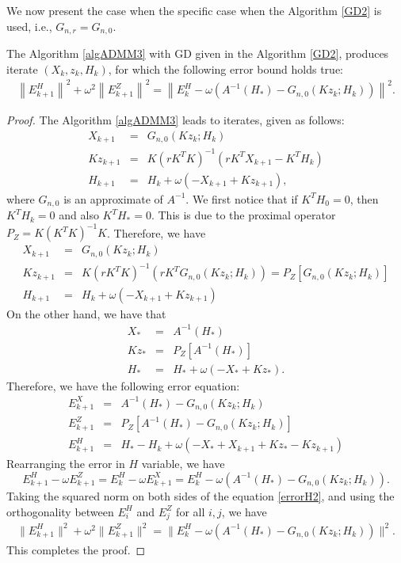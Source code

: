 \begin{itemize}
We now present the case when the specific case when the Algorithm \ref{GD2} is used, i.e., $G_{n,r} = G_{n,0}$.

\begin{theorem}\label{main:theorem01} 
The Algorithm \ref{algADMM3} with GD given in the Algorithm \ref{GD2}, produces iterate $(X_k, z_k, H_k)$, for which the following error bound holds true: 
\begin{eqnarray*}
\left \|E_{k+1}^H \right \|^2 + \omega^2 \left \|E_{k+1}^Z \right \|^2 = \left \|E_k^H - \omega (A^{-1} (H_*) - G_{n,0} (Kz_k; H_k)) \right \|^2. 
\end{eqnarray*}
\end{theorem}
\begin{proof} 
The Algorithm \ref{algADMM3} leads to iterates, given as follows: 
\begin{eqnarray*}
X_{k+1} &=& G_{n,0} (Kz_k;H_k) \\
Kz_{k+1} &=& K(rK^TK)^{-1} (rK^T X_{k+1} - K^TH_k) \\ 
H_{k+1} &=& H_k + \omega (-X_{k+1} + Kz_{k+1} ), 
\end{eqnarray*}
where $G_{n,0}$ is an approximate of $A^{-1}$. We first notice that if $K^TH_0 = 0$, then $K^TH_k = 0$ and also $K^TH_* = 0$. This is due to the proximal operator $P_Z = K(K^TK)^{-1}K$. Therefore, we have 
\begin{eqnarray*}
X_{k+1} &=& G_{n,0} (Kz_k; H_k) \\
Kz_{k+1} &=& K(rK^TK)^{-1} (rK^T G_{n,0} (Kz_k;H_k)) = P_Z [G_{n,0} (Kz_k; H_k)]  \\ 
H_{k+1} &=& H_k + \omega (-X_{k+1} + Kz_{k+1} )
\end{eqnarray*}
On the other hand, we have that 
\begin{eqnarray*}
X_{*} &=& A^{-1} (H_*) \\
Kz_{*} &=& P_Z [A^{-1}(H_*)] \\ 
H_{*} &=& H_* + \omega (-X_{*} + K z_{*}). 
\end{eqnarray*}
Therefore, we have the following error equation: 
\begin{eqnarray*}
E_{k+1}^X &=& A^{-1} (H_*) - G_{n,0} (Kz_k; H_k) \\
E_{k+1}^Z &=& P_Z [ A^{-1} (H_*) - G_{n,0}(Kz_k; H_k) ] \\
E_{k+1}^H &=& H_* - H_k + \omega (-X_* + X_{k+1} + Kz_{*} - K z_{k+1})
\end{eqnarray*}
Rearranging the error in $H$ variable, we have 
\begin{equation}\label{errorH2}
E_{k+1}^H - \omega E_{k+1}^Z = E_k^H - \omega E_{k+1}^X = E_k^H - \omega \left( A^{-1} (H_*) - G_{n,0}(Kz_k; H_k) \right).    
\end{equation}
Taking the squared norm on both sides of the equation \eqref{errorH2}, and using the orthogonality between $E_i^H$ and $E_j^Z$ for all $i,j$, we have 
\begin{eqnarray*}
\|E_{k+1}^H\|^2 + \omega^2 \|E_{k+1}^Z\|^2 = \|E_k^H - \omega (A^{-1} (H_*) - G_{n,0} (Kz_k; H_k))\|^2. 
\end{eqnarray*}
This completes the proof. 
\end{proof}


\end{itemize}

